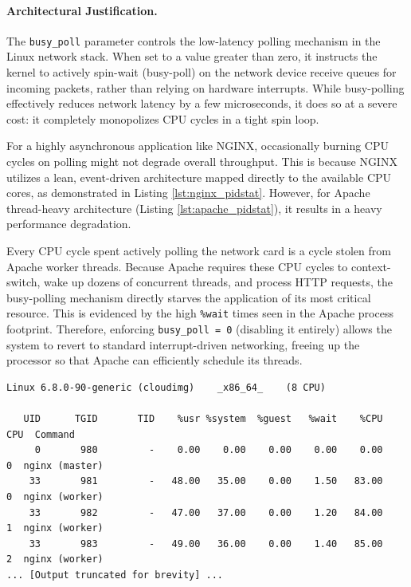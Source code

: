 \paragraph{Architectural Justification.}
The \texttt{busy\_poll} parameter controls the low-latency polling mechanism in the Linux network stack.
When set to a value greater than zero, it instructs the kernel to actively spin-wait (busy-poll) on the network device receive queues for incoming packets, rather than relying on hardware interrupts.
While busy-polling effectively reduces network latency by a few microseconds, it does so at a severe cost: it completely monopolizes CPU cycles in a tight spin loop.

For a highly asynchronous application like NGINX, occasionally burning CPU cycles on polling might not degrade overall throughput.
This is because NGINX utilizes a lean, event-driven architecture mapped directly to the available CPU cores, as demonstrated in Listing \ref{lst:nginx_pidstat}. However, for Apache thread-heavy architecture (Listing \ref{lst:apache_pidstat}), it results in a heavy performance degradation. 

Every CPU cycle spent actively polling the network card is a cycle stolen from Apache worker threads.
Because Apache requires these CPU cycles to context-switch, wake up dozens of concurrent threads, and process HTTP requests, the busy-polling mechanism directly starves the application of its most critical resource.
This is evidenced by the high \texttt{\%wait} times seen in the Apache process footprint.
Therefore, enforcing \texttt{busy\_poll = 0} (disabling it entirely) allows the system to revert to standard interrupt-driven networking, freeing up the processor so that Apache can efficiently schedule its threads.

\begin{lstlisting}[caption={NGINX \texttt{pidstat} output illustrating an asynchronous, event-driven architecture with low \texttt{\%wait} times and a 1:1 worker-to-CPU mapping.}, label={lst:nginx_pidstat}]
Linux 6.8.0-90-generic (cloudimg)    _x86_64_    (8 CPU)

   UID      TGID       TID    %usr %system  %guest   %wait    %CPU   CPU  Command
     0       980         -    0.00    0.00    0.00    0.00    0.00     0  nginx (master)
    33       981         -   48.00   35.00    0.00    1.50   83.00     0  nginx (worker)
    33       982         -   47.00   37.00    0.00    1.20   84.00     1  nginx (worker)
    33       983         -   49.00   36.00    0.00    1.40   85.00     2  nginx (worker)
... [Output truncated for brevity] ...
\end{lstlisting}

